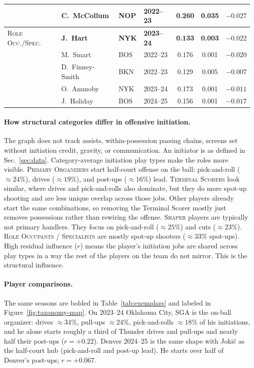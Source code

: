 \documentclass[11pt]{article}
\newcommand{\resid}{\ensuremath{r}} %
\begin{document}
\begin{table}[H]
{\begin{tabular}{@{}llllccc@{}}
 & C.\ McCollum & NOP & 2022--23 & 0.260 & 0.035 & $-0.027$ \\
\midrule
\textsc{Role Occ./Spec.}
 & \textbf{J.\ Hart} & \textbf{NYK} & \textbf{2023--24} & \textbf{0.133} & \textbf{0.003} & $\mathbf{-0.022}$ \\
 & M.\ Smart & BOS & 2022--23 & 0.176 & 0.001 & $-0.020$ \\
 & D.\ Finney-Smith & BKN & 2022--23 & 0.129 & 0.005 & $-0.007$ \\
 & O.\ Anunoby & NYK & 2023--24 & 0.173 & 0.001 & $-0.011$ \\
 & J.\ Holiday & BOS & 2024--25 & 0.156 & 0.001 & $-0.017$ \\
\bottomrule
\end{tabular}%
}
\end{table}

\paragraph{How structural categories differ in offensive initiation.}
The graph does not track assists, within-possession passing chains, screens set without
initiation credit, gravity, or communication. An initiator is as defined in
Sec.~\ref{sec:data}. Category-average initiation play types make the roles more visible.
\textsc{Primary Organizers} start half-court offense on the ball: pick-and-roll
($\approx\!24\%$), drives ($\approx\!19\%$), and post-ups ($\approx\!16\%$) lead.
\textsc{Terminal Scorers} look similar, where drives and pick-and-rolls also dominate, but
they do more spot-up shooting and are less unique overlap across those jobs. Other players
already start the same combinations, so removing the Terminal Scorer mostly just removes
possessions rather than rewiring the offense. \textsc{Shaper} players are typically not
primary handlers. They focus on pick-and-roll ($\approx\!25\%$) and cuts ($\approx\!23\%$).
\textsc{Role Occupants / Specialists} are mostly spot-up shooters ($\approx\!33\%$
spot-ups). High residual influence ($\resid$) means the player's initiation jobs are shared
across play types in a way the rest of the players on the team do not mirror. This is the
structural influence.

\paragraph{Player comparisons.}
The same seasons are bolded in Table~\ref{tab:exemplars} and labeled in
Figure~\ref{fig:taxonomy-map}. On 2023--24 Oklahoma City, SGA is the on-ball organizer:
drives $\approx\!34\%$, pull-ups $\approx\!24\%$, pick-and-rolls $\approx\!18\%$ of his
initiations, and he alone starts roughly a third of Thunder drives and pull-ups and nearly
half their post-ups ($\resid=+0.22$). Denver 2024--25 is the same shape with Joki\'c as the
half-court hub (pick-and-roll and post-up lead). He starts over half of Denver's post-ups;
$\resid=+0.067$.
\end{document}
